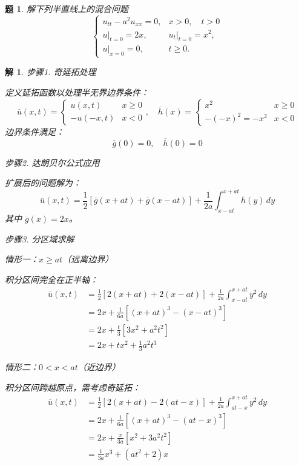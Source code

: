 \documentclass[12pt,a4paper]{article}
\newtheorem{problem}{题}
\newtheorem*{solution}{解}
\begin{document}
\newpage
\begin{problem}
	解下列半直线上的混合问题
	\[
	\begin{cases}
		u_{tt} - a^2 u_{xx} = 0, & x > 0, \quad t > 0 \\
		u|_{t=0} = 2x, & u_t |_{t=0} = x^2, \\
		u|_{x=0} = 0, & t \geq 0.
	\end{cases}
	\]
\end{problem}


	
	\begin{solution}
		
	步骤1. 奇延拓处理
			
		\noindent
		定义延拓函数以处理半无界边界条件：
		\[
		\overline{u}(x,t) = 
		\begin{cases} 
			u(x,t) & x \geq 0 \\
			-u(-x,t) & x < 0 
		\end{cases}, \quad
		\overline{h}(x) = 
		\begin{cases} 
			x^2 & x \geq 0 \\
			-(-x)^2 = -x^2 & x < 0 
		\end{cases}
		\]
		边界条件满足：
		\[
		\overline{g}(0) = 0, \quad \overline{h}(0) = 0
		\]
		
		步骤2. 达朗贝尔公式应用
			
		\noindent
		扩展后的问题解为：
		\[
		\overline{u}(x,t) = \frac{1}{2}\left[\overline{g}(x+at) + \overline{g}(x-at)\right] + \frac{1}{2a}\int_{x-at}^{x+at} \overline{h}(y) \, dy
		\]
		其中 \(\overline{g}(x) = 2x\)。
		
		步骤3. 分区域求解
	
		\noindent
	情形一：\(x \geq at\)（远离边界）
		
		\noindent
		积分区间完全在正半轴：
		\[
		\begin{aligned}
			\overline{u}(x,t) 
			&= \frac{1}{2}[2(x+at) + 2(x-at)] + \frac{1}{2a}\int_{x-at}^{x+at} y^2 \, dy \\
			&= 2x + \frac{1}{6a}\left[(x+at)^3 - (x-at)^3\right] \\
			&= 2x + \frac{t}{3}\left[3x^2 + a^2t^2\right] \\
			&= 2x + tx^2 + \frac{1}{3}a^2t^3
		\end{aligned}
		\]
		
			
		\noindent
		情形二：\(0 < x < at\)（近边界）
		
		积分区间跨越原点，需考虑奇延拓：
		\[
		\begin{aligned}
			\overline{u}(x,t) 
			&= \frac{1}{2}[2(x+at) - 2(at-x)] + \frac{1}{2a}\int_{at-x}^{x+at} y^2 \, dy \\
			&= 2x + \frac{1}{6a}\left[(x+at)^3 - (at-x)^3\right] \\
			&= 2x + \frac{x}{3a}\left[x^2 + 3a^2t^2\right] \\
			&= \frac{1}{3a}x^3 + (at^2 + 2)x
		\end{aligned}
		\]
		

\end{solution}
\end{document}
